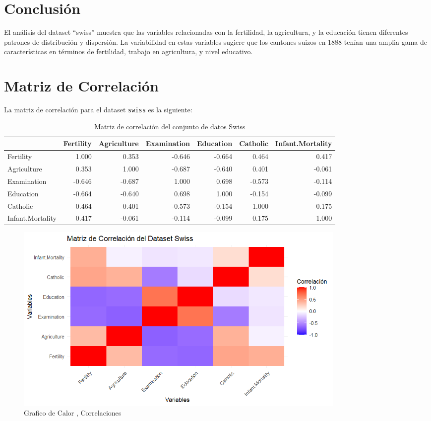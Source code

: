 \documentclass{article}
\begin{document}
\section{Conclusión}
El análisis del dataset ``swiss'' muestra que las variables relacionadas con la fertilidad, la agricultura, y la educación tienen diferentes patrones de distribución y dispersión. La variabilidad en estas variables sugiere que los cantones suizos en 1888 tenían una amplia gama de características en términos de fertilidad, trabajo en agricultura, y nivel educativo.

\section{Matriz de Correlación}

La matriz de correlación para el dataset \texttt{swiss} es la siguiente:

\begin{table}[ht]
    \centering
    \begin{adjustbox}{max width=\textwidth}
    \begin{tabular}{lrrrrrr}
    \hline
     & Fertility & Agriculture & Examination & Education & Catholic & Infant.Mortality \\ 
    \hline
    Fertility & 1.000 & 0.353 & -0.646 & -0.664 & 0.464 & 0.417 \\ 
    Agriculture & 0.353 & 1.000 & -0.687 & -0.640 & 0.401 & -0.061 \\ 
    Examination & -0.646 & -0.687 & 1.000 & 0.698 & -0.573 & -0.114 \\ 
    Education & -0.664 & -0.640 & 0.698 & 1.000 & -0.154 & -0.099 \\ 
    Catholic & 0.464 & 0.401 & -0.573 & -0.154 & 1.000 & 0.175 \\ 
    Infant.Mortality & 0.417 & -0.061 & -0.114 & -0.099 & 0.175 & 1.000 \\ 
    \hline
    \end{tabular}
    \end{adjustbox}
    \caption{Matriz de correlación del conjunto de datos Swiss}
    \label{tab:correlation_matrix_swiss}
\end{table}
\begin{figure}[h] %
    \centering %
    \includegraphics[width=0.8\textwidth]{Correlacion.png}
    \caption{Grafico de Calor , Correlaciones } %
    \label{fig:mi_imagen} %
\end{figure}
\end{document}
